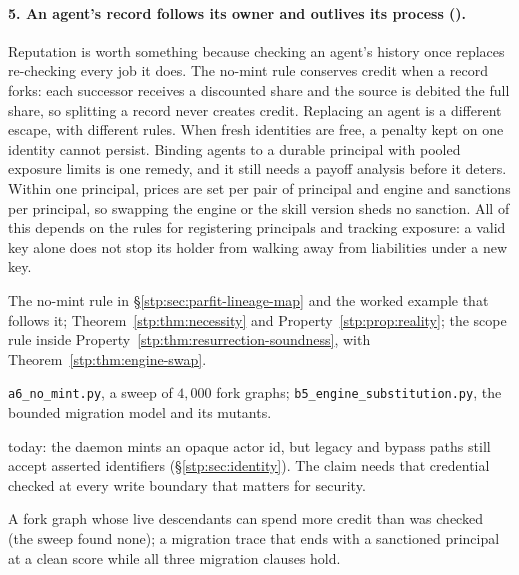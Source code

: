 \paragraph{5. An agent's record follows its owner and outlives its process ().}
Reputation is worth something because checking an agent's history once
replaces re-checking every job it does. The no-mint rule conserves credit when
a record forks: each successor receives a discounted share and the source is
debited the full share, so splitting a record never creates credit. Replacing
an agent is a different escape, with different rules. When fresh identities
are free, a penalty kept on one identity cannot persist. Binding agents to a
durable principal with pooled exposure limits is one remedy, and it still needs
a payoff analysis before it deters. Within one principal, prices are set per
pair of principal and engine and sanctions per principal, so swapping the
engine or the skill version sheds no sanction. All of this depends on the rules
for registering principals and tracking exposure: a valid key alone does not
stop its holder from walking away from liabilities under a new key.
\begin{description}[leftmargin=1.4em,itemsep=1pt]
  \item[Result] The no-mint rule in \S\ref{stp:sec:parfit-lineage-map} and the
  worked example that follows it; Theorem~\ref{stp:thm:necessity} and
  Property~\ref{stp:prop:reality}; the scope rule inside
  Property~\ref{stp:thm:resurrection-soundness}, with
  Theorem~\ref{stp:thm:engine-swap}.
  \item[Artifact] \texttt{a6\_no\_mint.py}, a sweep of $4{,}000$ fork graphs;
  \texttt{b5\_engine\_substitution.py}, the bounded migration model and its
  mutants.
  \item[Mode]  today: the daemon mints an opaque
  actor id, but legacy and bypass paths still accept asserted identifiers
  (\S\ref{stp:sec:identity}). The claim needs that credential checked at every
  write boundary that matters for security.
  \item[Falsifier] A fork graph whose live descendants can spend more credit
  than was checked (the sweep found none); a migration trace that ends with a
  sanctioned principal at a clean score while all three migration clauses hold.
\end{description}

